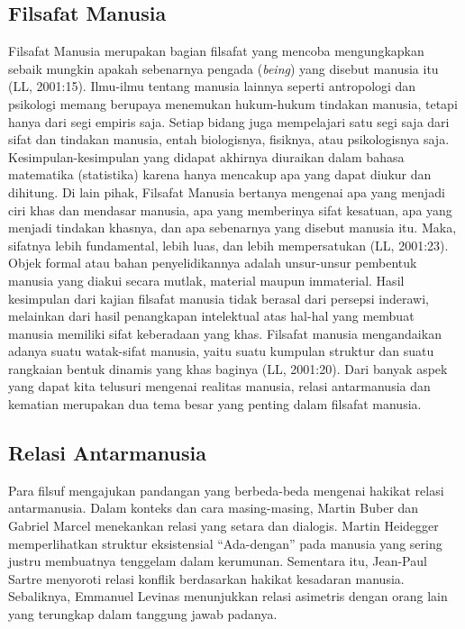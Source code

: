 \documentclass[10pt,a4paper]{article}
\renewenvironment{quote}
{\list{}{%
       \leftmargin 1.5em 
       \rightmargin 0em}
   \item\relax}
{\endlist}
\begin{document}
\setcounter{secnumdepth}{0}
\setcounter{tocdepth}{2}
\begin{multicols}{2}
\tableofcontents
\hypertarget{filsafat-manusia}{%
\section{Filsafat Manusia}\label{filsafat-manusia}}

Filsafat Manusia merupakan bagian filsafat yang mencoba mengungkapkan
sebaik mungkin apakah sebenarnya pengada (\emph{being}) yang disebut
manusia itu (LL, 2001:15). Ilmu-ilmu tentang manusia lainnya seperti
antropologi dan psikologi memang berupaya menemukan hukum-hukum tindakan
manusia, tetapi hanya dari segi empiris saja. Setiap bidang juga
mempelajari satu segi saja dari sifat dan tindakan manusia, entah
biologisnya, fisiknya, atau psikologisnya saja. Kesimpulan-kesimpulan
yang didapat akhirnya diuraikan dalam bahasa matematika (statistika)
karena hanya mencakup apa yang dapat diukur dan dihitung. Di lain pihak,
Filsafat Manusia bertanya mengenai apa yang menjadi ciri khas dan
mendasar manusia, apa yang memberinya sifat kesatuan, apa yang menjadi
tindakan khasnya, dan apa sebenarnya yang disebut manusia itu. Maka,
sifatnya lebih fundamental, lebih luas, dan lebih mempersatukan (LL,
2001:23). Objek formal atau bahan penyelidikannya adalah unsur-unsur
pembentuk manusia yang diakui secara mutlak, material maupun immaterial.
Hasil kesimpulan dari kajian filsafat manusia tidak berasal dari
persepsi inderawi, melainkan dari hasil penangkapan intelektual atas
hal-hal yang membuat manusia memiliki sifat keberadaan yang khas.
Filsafat manusia mengandaikan adanya suatu watak-sifat manusia, yaitu
suatu kumpulan struktur dan suatu rangkaian bentuk dinamis yang khas
baginya (LL, 2001:20). Dari banyak aspek yang dapat kita telusuri
mengenai realitas manusia, relasi antarmanusia dan kematian merupakan
dua tema besar yang penting dalam filsafat manusia.

\hypertarget{relasi-antarmanusia}{%
\subsection{Relasi Antarmanusia}\label{relasi-antarmanusia}}

\begin{quote}
Para filsuf mengajukan pandangan yang berbeda-beda mengenai hakikat
relasi antarmanusia. Dalam konteks dan cara masing-masing, Martin Buber
dan Gabriel Marcel menekankan relasi yang setara dan dialogis. Martin
Heidegger memperlihatkan struktur eksistensial ``Ada-dengan'' pada
manusia yang sering justru membuatnya tenggelam dalam kerumunan.
Sementara itu, Jean-Paul Sartre menyoroti relasi konflik berdasarkan
hakikat kesadaran manusia. Sebaliknya, Emmanuel Levinas menunjukkan
relasi asimetris dengan orang lain yang terungkap dalam tanggung jawab
padanya.
\end{quote}


\end{multicols}
\end{document}

